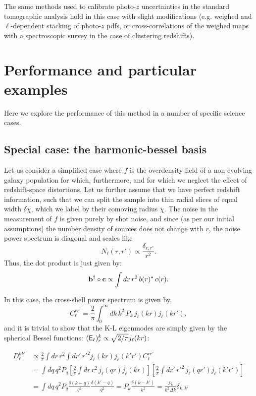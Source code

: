 \documentclass[twocolumn,amsfont,amssymb,amsmath, showpacs,balancelastpage, nofootinbib]{revtex4-1}
\begin{document}
    The same methods used to calibrate photo-$z$ uncertainties in the standard tomographic analysis hold in this case with slight modifications (e.g. weighed and $\ell$-dependent stacking of photo-$z$ pdfs, or cross-correlations of the weighed maps with a spectroscopic survey in the case of clustering redshifts).
  

\section{Performance and particular examples}\label{sec:results}
  Here we explore the performance of this method in a number of specific science cases.
  
  \subsection{Special case: the harmonic-bessel basis}\label{ssec:results.bessel}
    Let us consider a simplified case where $f$ is the overdensity field of a non-evolving galaxy population for which, furthermore, and for which we neglect the effect of redshift-space distortions. Let us further assume that we have perfect redshift information, such that we can split the sample into thin radial slices of equal width $\delta \chi$, which we label by their comoving radius $\chi$. The noise in the measurement of $f$ is given purely by shot noise, and since (as per our initial assumptions) the number density of sources does not change with $r$, the noise power spectrum is diagonal and scales like 
    \begin{equation}
      N_\ell(r,r')\propto \frac{\delta_{r,r'}}{r^2}.
    \end{equation}
    Thus, the dot product is just given by:
    \begin{equation}
      {\bf b}^\dag\circ{\bf c}\propto\int dr\,r^2\,b(r)^*\,c(r).
    \end{equation}
   
    In this case, the cross-shell power spectrum is given by,
    \begin{equation}
      C_\ell^{rr'}=\frac{2}{\pi}\int_0^\infty dk\,k^2\,P_k\,j_\ell(kr)j_\ell(kr'),
    \end{equation}
    and it is trivial to show that the K-L eigenmodes are simply given by the spherical Bessel functions: $({\sf E}_\ell)^k_r\propto \sqrt{2/\pi}j_\ell(kr)$:
    \begin{widetext}
    \begin{align}
      D_\ell^{kk'}&\propto\frac{2}{\pi}\int dr\,r^2\int dr'\,r'^2 j_\ell(kr)j_\ell(k'r') C_\ell^{rr'}\\
      &=\int dq\,q^2P_q\left[\frac{2}{\pi}\int dr\,r^2\,j_\ell(qr)j_\ell(kr)\right]\left[\frac{2}{\pi}\int dr'\,r'^2\,j_\ell(qr')j_\ell(k'r')\right]\\
      &=\int dq\,q^2P_q\frac{\delta(k-q)}{q^2}\frac{\delta(k'-q)}{q^2}=P_k\frac{\delta(k-k')}{k^2}=\frac{P_k}{k^2\Delta k}\delta_{k,k'}
    \end{align}
    \end{widetext}
   
\end{document}

